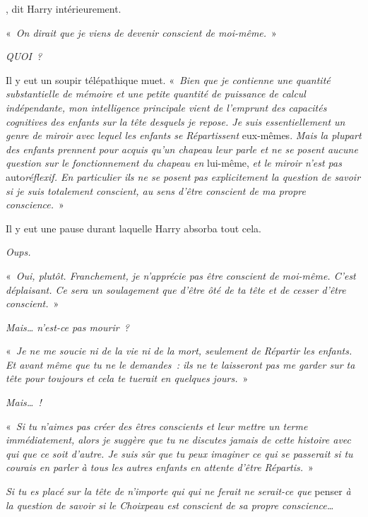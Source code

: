 

, dit Harry intérieurement.

\hplettrineextrapara
«~\emph{On dirait que je viens de devenir conscient de moi-même.}~»

\emph{QUOI~?}

Il y eut un soupir télépathique muet.
«~\emph{Bien que je contienne une quantité substantielle de mémoire et une petite quantité de puissance de calcul indépendante, mon intelligence principale vient de l'emprunt des capacités cognitives des enfants sur la tête desquels je repose.
Je suis essentiellement un genre de miroir avec lequel les enfants se Répartissent} eux-mêmes.
\emph{Mais la plupart des enfants prennent pour acquis qu'un chapeau leur parle et ne se posent aucune question sur le fonctionnement du chapeau en} lui-même, \emph{et le miroir n'est pas} auto\emph{réflexif. En particulier ils ne se posent pas explicitement la question de savoir si je suis totalement conscient, au sens d'être conscient de ma propre conscience.}~»

Il y eut une pause durant laquelle Harry absorba tout cela.

\emph{Oups.}

«~\emph{Oui, plutôt. Franchement, je n'apprécie pas être conscient de moi-même. C'est déplaisant. Ce sera un soulagement que d'être ôté de ta tête et de cesser d'être conscient.}~»

\emph{Mais… n'est-ce pas mourir~?}

«~\emph{Je ne me soucie ni de la vie ni de la mort, seulement de Répartir les enfants. Et avant même que tu ne le demandes~: ils ne te laisseront pas me garder sur ta tête pour toujours et cela te tuerait en quelques jours.}~»

\emph{Mais…~!}

«~\emph{Si tu n'aimes pas créer des êtres conscients et leur mettre un terme immédiatement, alors je suggère que tu ne discutes jamais de cette histoire avec qui que ce soit d'autre.
Je suis sûr que tu peux imaginer ce qui se passerait si tu courais en parler à tous les autres enfants en attente d'être Répartis.}~»

\emph{Si tu es placé sur la tête de n'importe qui qui ne ferait ne serait-ce que} penser \emph{à la question de savoir si le Choixpeau est conscient de sa propre conscience…}


